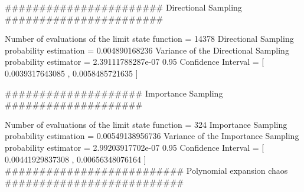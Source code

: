 #######################
Directional Sampling
#######################
 
Number of evaluations of the limit state function =  14378
Directional Sampling probability estimation =  0.004890168236
Variance of the Directional Sampling probability estimator =  2.39111788287e-07
0.95 Confidence Interval = [ 0.0039317643085 ,  0.0058485721635 ]

####################
Importance Sampling
####################

Number of evaluations of the limit state function =  324
Importance Sampling probability estimation =  0.00549138956736
Variance of the Importance Sampling probability estimator =  2.99203917702e-07
0.95 Confidence Interval = [ 0.00441929837308 ,  0.00656348076164 ]
##########################
Polynomial expansion chaos
##########################
 

